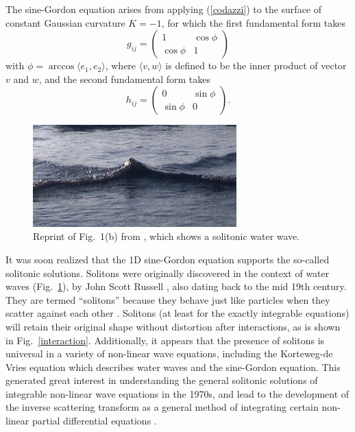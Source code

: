 \documentclass[11pt]{book}
\begin{document}
The sine-Gordon equation arises from applying (\ref{codazzi}) to the surface of constant Gaussian curvature $K=-1$, for which the first fundamental form \cite{do1976differential} takes
\begin{equation}
  g_{ij} = \left( \begin{array}{cc}
    1& \cos\phi\\
    \cos\phi&1
    \end{array}\right)
\end{equation}
with $\phi = \arccos \langle e_1,e_2\rangle$, where $\langle v, w\rangle$ is defined to be the inner product of vector $v$ and $w$, and the second fundamental form takes
\begin{equation}
  h_{ij} = \left( \begin{array}{cc}
    0& \sin\phi\\
    \sin\phi&0
    \end{array}\right).
\end{equation}

\begin{figure}\centering
  \includegraphics[width=0.7\textwidth]{plot/water-soliton.png}
  \caption{Reprint of Fig.~1(b) from \cite{PhysRevE.86.036305}, which shows a solitonic water wave.}
  \label{water}
\end{figure}

It was soon realized that the 1D sine-Gordon equation supports the so-called solitonic solutions. Solitons were originally discovered in the context of water waves (Fig.~\ref{water}), by John Scott Russell \cite{russell}, also dating back to the mid 19th century. They are termed ``solitons'' because they behave just like particles when they scatter against each other \cite{Perring:1962vs}. Solitons (at least for the exactly integrable equations) will retain their original shape without distortion after interactions, as is shown in Fig.~\ref{interaction}. Additionally, it appears that the presence of solitons is universal in a variety of non-linear wave equations, including the Korteweg-de Vries equation which describes water waves \cite{ablowitz} and the sine-Gordon equation. This generated great interest in understanding the general solitonic solutions of integrable non-linear wave equations in the 1970s, and lead to the development of the inverse scattering transform as a general method of integrating certain non-linear partial differential equations \cite{SAPM:SAPM1974534249}.
\end{document}
